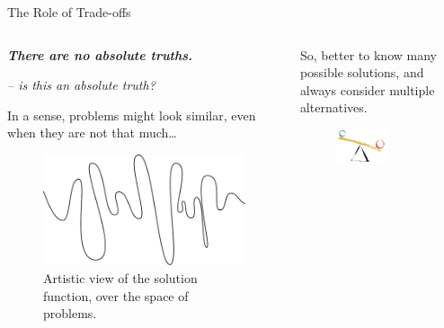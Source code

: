 \documentclass[9pt]{beamer}
\begin{document}
\begin{frame}{The Role of Trade-offs}
    \begin{columns}
        \begin{column}{0.5\textwidth}
            \vspace*{20pt}
            \begin{center}
                \itshape\bfseries 
                There are no absolute truths.
            \end{center}
            \begin{flushright}
                \itshape
                -- is this an absolute truth? 
            \end{flushright}

            \vspace*{10pt}
            In a sense, problems might look similar, even when they are not
            that much\dots
            \vspace*{20pt}
            
            \begin{figure}
                \centering
                \includegraphics[width=\textwidth]{solution}
                \caption{
                    Artistic view of the solution function, over the space of
                    problems.
                }
            \end{figure}
        \end{column}
        \begin{column}{0.5\textwidth}
            So, better to know many possible solutions, and always consider
            multiple alternatives.

            \vspace*{10pt}
            \begin{figure}
                \centering
                \includegraphics[width=0.6\textwidth]{balancing}
            \end{figure}
            \vspace*{10pt}


\end{column}
\end{columns}
\end{frame}
\end{document}
